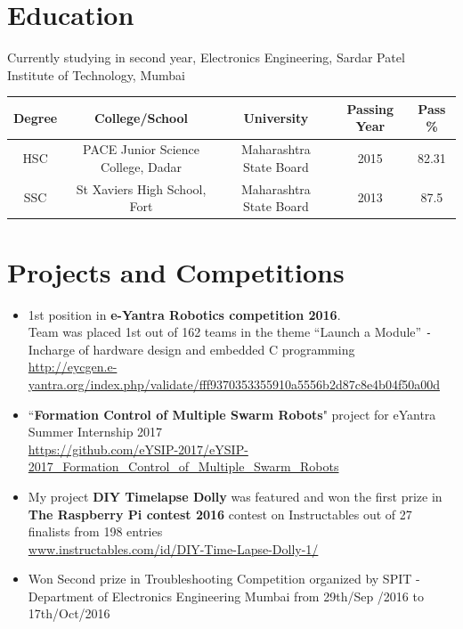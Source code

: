 \documentclass{article}
\begin{document}
	\section*{Education}
	
	Currently studying in second year, Electronics Engineering, Sardar Patel Institute of Technology, Mumbai
	\newline
	\begin{tabular}{|c|c|c|c|c|}
		\hline
		Degree & College/School & University & Passing Year & Pass \% \\
		\hline
		HSC & PACE Junior Science College, Dadar & Maharashtra State Board & 2015 & 82.31\\
		\hline
		SSC & St Xaviers High School, Fort & Maharashtra State Board  & 2013 & 87.5\\
		\hline
	\end{tabular}
	
	\section*{Projects and Competitions}
	\begin{itemize}%
		
		\item 1st position in \textbf{e-Yantra Robotics competition 2016}. \\
		Team was placed 1st out of 162 teams in the theme ``Launch a Module''  
		\verb|-| Incharge of hardware design and embedded C programming\\
		\url{http://eycgen.e-yantra.org/index.php/validate/fff9370353355910a5556b2d87c8e4b04f50a00d}		
		
		\item``\textbf{Formation Control of Multiple Swarm Robots}" project for eYantra Summer Internship 2017\\
		\url{https://github.com/eYSIP-2017/eYSIP-2017_Formation_Control_of_Multiple_Swarm_Robots}
			
		\item My project \textbf{DIY Timelapse Dolly} was featured and won the first prize in \textbf{The Raspberry Pi contest 2016} contest on Instructables out of 27 finalists from 198 entries\\
		\url{www.instructables.com/id/DIY-Time-Lapse-Dolly-1/}
		
		\item Won Second prize in Troubleshooting Competition organized by SPIT - Department of Electronics Engineering Mumbai from 29th/Sep /2016 to 17th/Oct/2016			
	\end{itemize}
	
\end{document}
